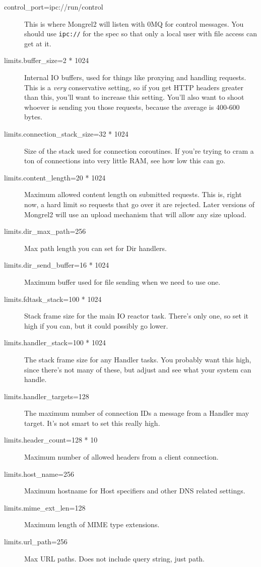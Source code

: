 \begin{description}
\item[control\_port=ipc://run/control] This is where Mongrel2 will listen with 0MQ for control messages.  You should use \verb|ipc://| for the spec so that only a local user with file access can get at it.
\item[limits.buffer\_size=2 * 1024] Internal IO buffers, used for things like proxying and handling requests.  This is a \emph{very} conservative setting, so if you get HTTP headers greater than this, you'll want to increase this setting.  You'll also want to shoot whoever is sending you those requests, because the average is 400-600 bytes.
\item[limits.connection\_stack\_size=32 * 1024] Size of the stack used for connection coroutines.  If you're trying to cram a ton of connections into very little RAM, see how low this can go.
\item[limits.content\_length=20 * 1024] Maximum allowed content length on submitted requests.  This is, right now, a hard limit so requests that go over it are rejected.  Later versions of Mongrel2 will use an upload mechanism that will allow any size upload.
\item[limits.dir\_max\_path=256] Max path length you can set for Dir handlers.
\item[limits.dir\_send\_buffer=16 * 1024] Maximum buffer used for file sending when we need to use one.
\item[limits.fdtask\_stack=100 * 1024] Stack frame size for the main IO reactor task.  There's only one, so set it high if you can, but it could possibly go lower.
\item[limits.handler\_stack=100 * 1024] The stack frame size for any Handler tasks. You probably want this high, since there's not many of these, but adjust and see what your system can handle.
\item[limits.handler\_targets=128] The maximum number of connection IDs a message from a Handler may target.  It's not smart to set this really high.
\item[limits.header\_count=128 * 10] Maximum number of allowed headers from a client connection.
\item[limits.host\_name=256] Maximum hostname for Host specifiers and other DNS related settings.
\item[limits.mime\_ext\_len=128] Maximum length of MIME type extensions.
\item[limits.url\_path=256] Max URL paths. Does not include query string, just path.

\end{description}
